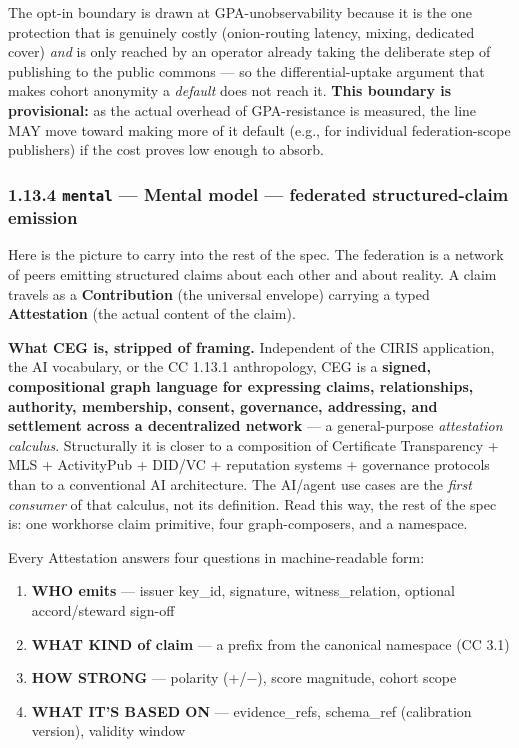 \documentclass[11pt]{article}
\begin{document}
The opt-in boundary is drawn at GPA-unobservability because it is the one protection that is genuinely costly (onion-routing latency, mixing, dedicated cover) \textit{and} is only reached by an operator already taking the deliberate step of publishing to the public commons — so the differential-uptake argument that makes cohort anonymity a \textit{default} does not reach it. \textbf{This boundary is provisional:} as the actual overhead of GPA-resistance is measured, the line MAY move toward making more of it default (e.g., for individual federation-scope publishers) if the cost proves low enough to absorb.


\subsubsection*{1.13.4 \texttt{mental} — Mental model — federated structured-claim emission}


Here is the picture to carry into the rest of the spec. The federation is a network of peers emitting structured claims about each other and about reality. A claim travels as a \textbf{Contribution} (the universal envelope) carrying a typed \textbf{Attestation} (the actual content of the claim).


\textbf{What CEG is, stripped of framing.} Independent of the CIRIS application, the AI vocabulary, or the CC 1.13.1 anthropology, CEG is a \textbf{signed, compositional graph language for expressing claims, relationships, authority, membership, consent, governance, addressing, and settlement across a decentralized network} — a general-purpose \textit{attestation calculus}. Structurally it is closer to a composition of Certificate Transparency + MLS + ActivityPub + DID/VC + reputation systems + governance protocols than to a conventional AI architecture. The AI/agent use cases are the \textit{first consumer} of that calculus, not its definition. Read this way, the rest of the spec is: one workhorse claim primitive, four graph-composers, and a namespace.


Every Attestation answers four questions in machine-readable form:


\begin{enumerate}\setlength\itemsep{0pt}
\item \textbf{WHO emits} — issuer key\_id, signature, witness\_relation, optional accord/steward sign-off
\item \textbf{WHAT KIND of claim} — a prefix from the canonical namespace (CC 3.1)
\item \textbf{HOW STRONG} — polarity (+/−), score magnitude, cohort scope
\item \textbf{WHAT IT'S BASED ON} — evidence\_refs, schema\_ref (calibration version), validity window
\end{enumerate}
\end{document}
